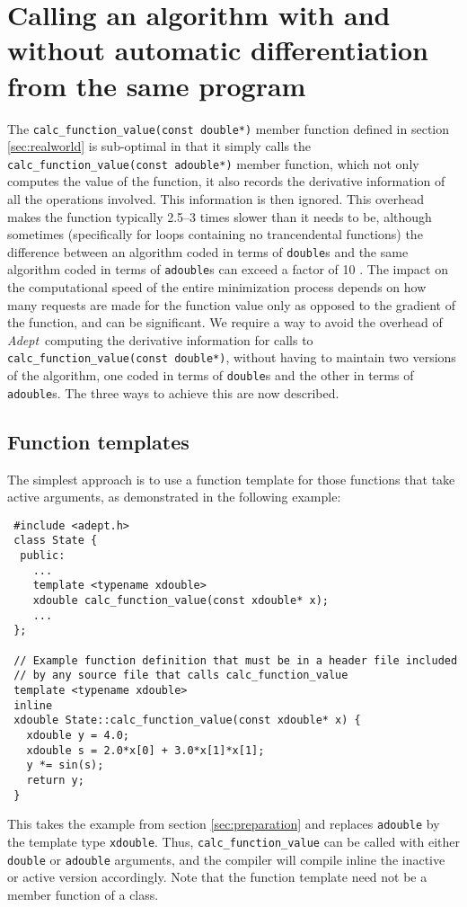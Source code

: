 \documentclass[a4,oneside]{book}
\def\codesize{\small}
\def\Adept{\emph{Adept}}
\def\code#1{{\codesize\texttt{#1}}}
\begin{document}
\section{Calling an algorithm with and without automatic differentiation from the same program}
\label{sec:withwithout}
The \code{calc\_function\_value(const double*)} member function
defined in section \ref{sec:realworld} is sub-optimal in that it
simply calls the \code{calc\_function\_value(const adouble*)} member
function, which not only computes the value of the function, it also
records the derivative information of all the operations involved.
This information is then ignored. This overhead makes the function
typically 2.5--3 times slower than it needs to be, although sometimes
(specifically for loops containing no trancendental functions) the
difference between an algorithm coded in terms of \code{double}s and
the same algorithm coded in terms of \code{adouble}s can exceed a
factor of 10 \citep{Hogan2014}.  The impact on the computational speed
of the entire minimization process depends on how many requests are
made for the function value only as opposed to the gradient of the
function, and can be significant.  We require a way to avoid the
overhead of \Adept\ computing the derivative information for calls to
\code{calc\_function\_value(const double*)}, without having to
maintain two versions of the algorithm, one coded in terms of
\code{double}s and the other in terms of \code{adouble}s. The three
ways to achieve this are now described.
%
\subsection{Function templates}
\label{sec:func_templates}
The simplest approach is to use a function template for those
functions that take active arguments, as demonstrated in the following
example:
%
\begin{lstlisting}
 #include <adept.h>
 class State {
  public:
    ...
    template <typename xdouble>
    xdouble calc_function_value(const xdouble* x);
    ...
 };

 // Example function definition that must be in a header file included
 // by any source file that calls calc_function_value
 template <typename xdouble>
 inline
 xdouble State::calc_function_value(const xdouble* x) {
   xdouble y = 4.0;
   xdouble s = 2.0*x[0] + 3.0*x[1]*x[1];
   y *= sin(s);
   return y;
 }
\end{lstlisting}
%
This takes the example from section \ref{sec:preparation} and replaces
\code{adouble} by the template type \code{xdouble}. Thus,
\code{calc\_function\_value} can be called with either \code{double}
or \code{adouble} arguments, and the compiler will compile inline the
inactive or active version accordingly.  Note that the function
template need not be a member function of a class.  
\end{document}
